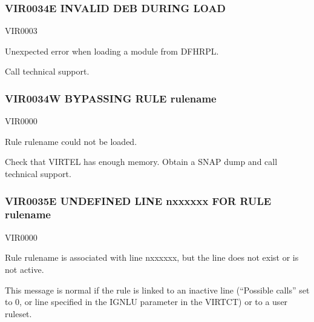 \documentclass[letterpaper,10pt,english]{sphinxmanual}
\begin{document}
\subsubsection{VIR0034E INVALID DEB DURING LOAD}
\label{\detokenize{messages:vir0034e-invalid-deb-during-load}}\begin{description}
\sphinxAtStartPar
VIR0003

\sphinxAtStartPar
Unexpected error when loading a module from DFHRPL.

\sphinxAtStartPar
Call technical support.

\end{description}


\subsubsection{VIR0034W BYPASSING RULE rulename}
\label{\detokenize{messages:vir0034w-bypassing-rule-rulename}}\begin{description}
\sphinxAtStartPar
VIR0000

\sphinxAtStartPar
Rule rulename could not be loaded.

\sphinxAtStartPar
Check that VIRTEL has enough memory. Obtain a SNAP dump and call technical support.

\end{description}


\subsubsection{VIR0035E UNDEFINED LINE n\sphinxhyphen{}xxxxxx FOR RULE rulename}
\label{\detokenize{messages:vir0035e-undefined-line-n-xxxxxx-for-rule-rulename}}\begin{description}
\sphinxAtStartPar
VIR0000

\sphinxAtStartPar
Rule rulename is associated with line n\sphinxhyphen{}xxxxxx, but the line does not exist or is not active.

\sphinxAtStartPar
This message is normal if the rule is linked to an inactive line (“Possible calls” set to 0, or line specified in the IGNLU parameter in the VIRTCT) or to a user ruleset.

\end{description}
\end{document}
